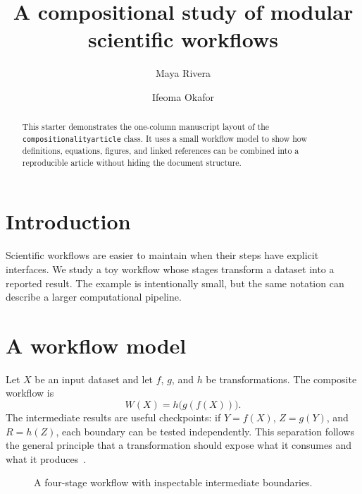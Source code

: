 \documentclass[a4paper,onecolumn,10pt,allowtoday]{compositionalityarticle}
\begin{document}
\title{A compositional study of modular scientific workflows}
\date{}
\author{Maya Rivera}
\author{Ifeoma Okafor}
\maketitle

\begin{abstract}
  This starter demonstrates the one-column manuscript layout of the
  \texttt{compositionalityarticle} class. It uses a small workflow model to
  show how definitions, equations, figures, and linked references can be
  combined into a reproducible article without hiding the document structure.
\end{abstract}

\section{Introduction}
Scientific workflows are easier to maintain when their steps have explicit
interfaces. We study a toy workflow whose stages transform a dataset into a
reported result. The example is intentionally small, but the same notation can
describe a larger computational pipeline.

\section{A workflow model}
Let $X$ be an input dataset and let $f$, $g$, and $h$ be transformations. The
composite workflow is
\begin{equation}
  W(X) = h\bigl(g(f(X))\bigr).
  \label{eq:workflow}
\end{equation}
The intermediate results are useful checkpoints: if $Y=f(X)$, $Z=g(Y)$, and
$R=h(Z)$, each boundary can be tested independently. This separation follows
the general principle that a transformation should expose what it consumes and
what it produces~\cite{wickham2014}.

\begin{figure}[ht]
  \centering
  \caption{A four-stage workflow with inspectable intermediate boundaries.}
  \label{fig:workflow}
\end{figure}
\end{document}
